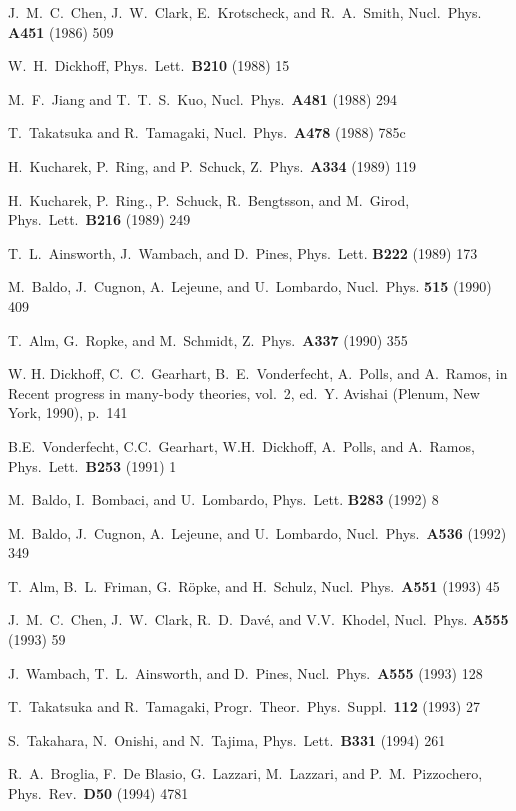\begin{thebibliography}{999}
 J.~M.~C.~Chen, J.~W.~Clark, E.~Krotscheck, and 
R.~A.~Smith, Nucl.~Phys. {\bf A451} (1986) 509

W.~H.~Dickhoff, Phys.~Lett.\ {\bf B210} (1988) 15

M.~F.~Jiang and T.~T.~S.~Kuo, Nucl.\ Phys.\ {\bf A481} (1988) 294

T.~Takatsuka and R.~Tamagaki, Nucl.\ Phys.\ {\bf A478} (1988) 785c 

H.~Kucharek, P.~Ring, and P.~Schuck, Z.\ Phys.\ {\bf A334} (1989)
119

H.~Kucharek, P.~Ring., P.~Schuck, R.~Bengtsson, and M.~Girod,
Phys.\ Lett.\ {\bf B216} (1989) 249

 T.~L.~Ainsworth, J.~Wambach, and D.~Pines, Phys.~Lett.
{\bf B222} (1989) 173

 M.~Baldo, J.~Cugnon, A.~Lejeune, and U.~Lombardo, Nucl.~Phys.
{\bf 515} (1990) 409

 T.~Alm, G.~Ropke, and M.~Schmidt, Z.~Phys.\ {\bf A337} (1990)
355

W. H. Dickhoff, C.~C.~Gearhart, B.~E.~Vonderfecht, A.~Polls, and A.~Ramos,
in Recent progress in many-body theories, vol.\ 2, ed.\ Y. Avishai
(Plenum, New York, 1990), p.\ 141

 B.E.~Vonderfecht, C.C.~Gearhart, W.H.~Dickhoff, A.~Polls,
and A.~Ramos, Phys.~Lett.\ {\bf B253} (1991) 1

 M.~Baldo, I.~Bombaci, and U.~Lombardo, Phys.~Lett.
{\bf B283} (1992) 8

 M.~Baldo, J.~Cugnon, A.~Lejeune, and U.~Lombardo,
Nucl.\ Phys.\ {\bf A536} (1992) 349

T.~Alm, B.~L.~Friman, G.~R\"opke, and H.~Schulz, Nucl.\ Phys.\ 
{\bf A551} (1993) 45 

 J.~M.~C.~Chen, J.~W.~Clark, R.~D.~Dav\'e, and
V.V.~Khodel, Nucl.~Phys. {\bf A555} (1993) 59

J.~Wambach, T.~L.~Ainsworth, and D.~Pines, Nucl.\ Phys.\ {\bf A555}
(1993) 128

 T.~Takatsuka and R.~Tamagaki, Progr.\ Theor.\ Phys.\ 
Suppl.\ {\bf 112} (1993) 27

S.~Takahara, N.~Onishi, and N.~Tajima, Phys.\ Lett.\ {\bf B331} (1994) 261 

\bibitem{crust1} R.~A.~Broglia, F.~De Blasio, G.~Lazzari, M.~Lazzari, 
and P.~M.~Pizzochero, Phys.\ Rev.\ {\bf D50} (1994) 4781


\end{thebibliography}
